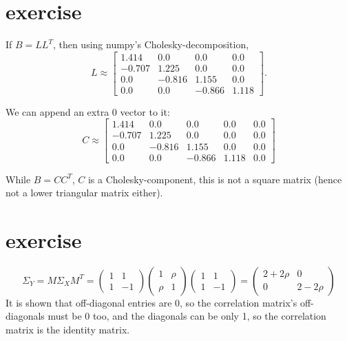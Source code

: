 \documentclass{article}
\begin{document}
\section{exercise}
If $B=LL^T$, then using numpy's Cholesky-decomposition,
\[L \approx \displaystyle \left[\begin{matrix}1.414 & 0.0 & 0.0 & 0.0\\-0.707 & 1.225 & 0.0 & 0.0\\0.0 & -0.816 & 1.155 & 0.0\\0.0 & 0.0 & -0.866 & 1.118\end{matrix}\right].\]

We can append an extra 0 vector to it:
\[C \approx \displaystyle \left[\begin{matrix}1.414 & 0.0 & 0.0 & 0.0 & 0.0\\-0.707 & 1.225 & 0.0 & 0.0 & 0.0\\0.0 & -0.816 & 1.155 & 0.0 & 0.0\\0.0 & 0.0 & -0.866 & 1.118 & 0.0\end{matrix}\right]\]

While $B=CC^T$, $C$ is a Cholesky-component, this is not a square matrix (hence not a lower triangular matrix either).

\section{exercise}
\[
    \Sigma_Y = M \Sigma_X M^T = \begin{pmatrix} 1 & 1 \\ 1 & -1 \end{pmatrix} \begin{pmatrix} 1 & \rho \\ \rho & 1 \end{pmatrix} \begin{pmatrix} 1 & 1 \\ 1 & -1 \end{pmatrix} = \begin{pmatrix} 2 + 2\rho & 0 \\ 0 & 2 - 2\rho \end{pmatrix}
\]
It is shown that off-diagonal entries are 0,
so the correlation matrix's off-diagonals must be 0 too, and the diagonals can be only 1, so
the correlation matrix is the identity matrix.
\end{document}
